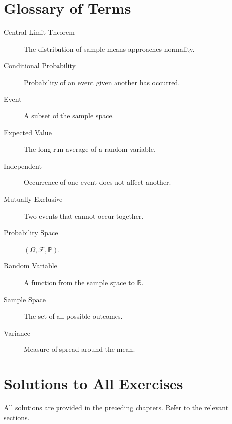 \documentclass[12pt,a4paper,oneside]{report}
\theoremstyle{mytheorem}
\theoremstyle{mydefinition}
\theoremstyle{myremark}
\newcommand{\Prob}{\mathbb{P}}
\begin{document}
\chapter{Glossary of Terms}
\begin{description}
    \item[Central Limit Theorem] The distribution of sample means approaches normality.
    \item[Conditional Probability] Probability of an event given another has occurred.
    \item[Event] A subset of the sample space.
    \item[Expected Value] The long-run average of a random variable.
    \item[Independent] Occurrence of one event does not affect another.
    \item[Mutually Exclusive] Two events that cannot occur together.
    \item[Probability Space] $(\Omega, \mathcal{F}, \Prob)$.
    \item[Random Variable] A function from the sample space to $\mathbb{R}$.
    \item[Sample Space] The set of all possible outcomes.
    \item[Variance] Measure of spread around the mean.
\end{description}

\chapter{Solutions to All Exercises}
All solutions are provided in the preceding chapters. Refer to the relevant sections.
\end{document}
